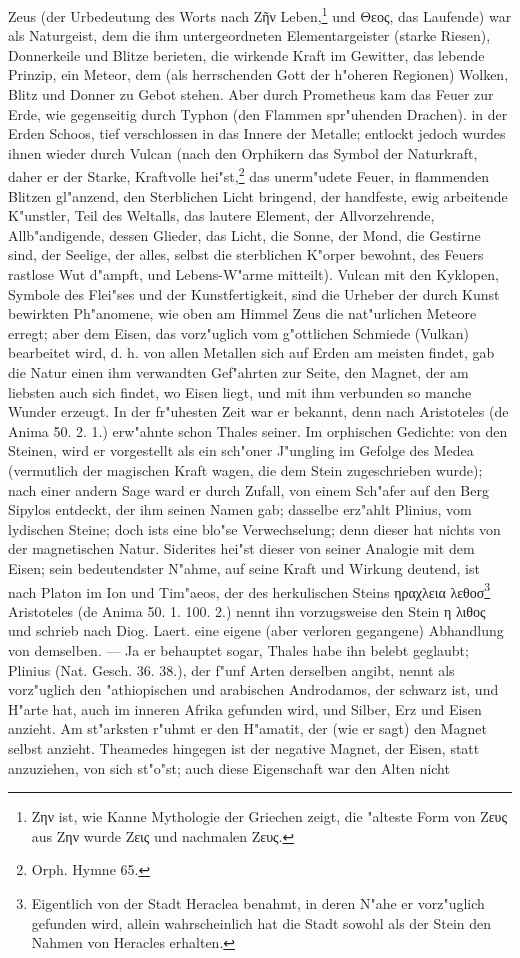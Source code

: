 \documentclass[a4paper, 11pt, oneside, polutonikogreek, german]{article}
\begin{document}
Zeus (der Urbedeutung des Worts nach Ζῆν Leben,\footnote{Ζην ist, wie Kanne Mythologie der Griechen zeigt, die "alteste Form von Ζευς aus Ζην wurde Ζεις und nachmalen Ζευς.} und Θεος, das Laufende) war als Naturgeist, dem die ihm untergeordneten Elementargeister (starke Riesen), Donnerkeile und Blitze berieten, die wirkende Kraft im Gewitter, das lebende Prinzip, ein Meteor, dem (als herrschenden Gott der h"oheren Regionen) Wolken, Blitz und Donner zu Gebot stehen. Aber durch Prometheus kam das Feuer zur Erde, wie gegenseitig durch Typhon (den Flammen spr"uhenden Drachen). in der Erden Schoos, tief verschlossen in das Innere der Metalle; entlockt jedoch wurdes ihnen wieder durch Vulcan (nach den Orphikern das Symbol der Naturkraft, daher er der Starke, Kraftvolle hei"st,\footnote{Orph. Hymne 65.} das unerm"udete Feuer, in flammenden Blitzen gl"anzend, den Sterblichen Licht bringend, der handfeste, ewig arbeitende K"unstler, Teil des Weltalls, das lautere Element, der Allvorzehrende, Allb"andigende, dessen Glieder, das Licht, die Sonne, der Mond, die Gestirne sind, der Seelige, der alles, selbst die sterblichen K"orper bewohnt, des Feuers rastlose Wut d"ampft, und Lebens-W"arme mitteilt). Vulcan mit den Kyklopen, Symbole des Flei"ses und der Kunstfertigkeit, sind die Urheber der durch Kunst bewirkten Ph"anomene, wie oben am Himmel Zeus die nat"urlichen Meteore erregt; aber dem Eisen, das vorz"uglich vom g"ottlichen Schmiede (Vulkan) bearbeitet wird, d. h. von allen Metallen sich auf Erden am meisten findet, gab die Natur einen ihm verwandten Gef"ahrten zur Seite, den Magnet, der am liebsten auch sich findet, wo Eisen liegt, und mit ihm verbunden so manche Wunder erzeugt. In der fr"uhesten Zeit war er bekannt, denn nach Aristoteles (de Anima 50. 2. 1.) erw"ahnte schon Thales seiner. Im orphischen Gedichte: von den Steinen, wird er vorgestellt als ein sch"oner J"ungling im Gefolge des Medea (vermutlich der magischen Kraft wagen, die dem Stein zugeschrieben wurde); nach einer andern Sage ward er durch Zufall, von einem Sch"afer auf den Berg Sipylos entdeckt, der ihm seinen Namen gab; dasselbe erz"ahlt Plinius, vom lydischen Steine; doch ists eine blo"se Verwechselung; denn dieser hat nichts von der magnetischen Natur. Siderites hei"st dieser von seiner Analogie mit dem Eisen; sein bedeutendster N"ahme, auf seine Kraft und Wirkung deutend, ist nach Platon im Ion und Tim"aeos, der des herkulischen Steins ηραχλεια λεθοσ\footnote{Eigentlich von der Stadt Heraclea benahmt, in deren N"ahe er vorz"uglich gefunden wird, allein wahrscheinlich hat die Stadt sowohl als der Stein den Nahmen von Heracles erhalten.} Aristoteles (de Anima 50. 1. 100. 2.) nennt ihn vorzugsweise den Stein η λιθος und schrieb nach Diog. Laert. eine eigene (aber verloren gegangene) Abhandlung von demselben. --- Ja er behauptet sogar, Thales habe ihn belebt geglaubt; Plinius (Nat. Gesch. 36. 38.), der f"unf Arten derselben angibt, nennt als vorz"uglich den "athiopischen und arabischen Androdamos, der schwarz ist, und H"arte hat, auch im inneren Afrika gefunden wird, und Silber, Erz und Eisen anzieht. Am st"arksten r"uhmt er den H"amatit, der (wie er sagt) den Magnet selbst anzieht. Theamedes hingegen ist der negative Magnet, der Eisen, statt anzuziehen, von sich st"o"st; auch diese Eigenschaft war den Alten nicht 
\end{document}
